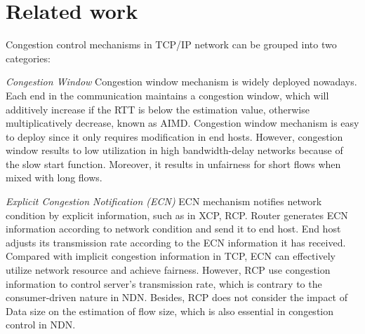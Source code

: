 
\section{Related work}

\label{sec:related}




Congestion control mechanisms in TCP/IP network can be grouped into two categories:

\emph{Congestion Window} Congestion window mechanism is widely deployed nowadays. Each end in the communication maintains a congestion window, which will additively increase if the RTT is below the estimation value, otherwise multiplicatively decrease, known as AIMD\cite{TCP}. Congestion window mechanism is easy to deploy since it only requires modification in end hosts. However, congestion window results to low utilization in high bandwidth-delay networks because of the slow start function. Moreover, it results in unfairness for short flows when mixed with long flows.

\emph{Explicit Congestion Notification (ECN)} ECN mechanism notifies network condition by explicit information, such as in XCP\cite{XCP}, RCP\cite{RCP}. Router generates ECN information according to network condition and send it to end host. End host adjusts its transmission rate according to the ECN information it has received. Compared with implicit congestion information in TCP, ECN can effectively utilize network resource and achieve fairness. However, RCP use congestion information to control server's transmission rate, which is contrary to the consumer-driven nature in NDN. Besides, RCP does not consider the impact of Data size on the estimation of flow size, which is also essential in congestion control in NDN.


